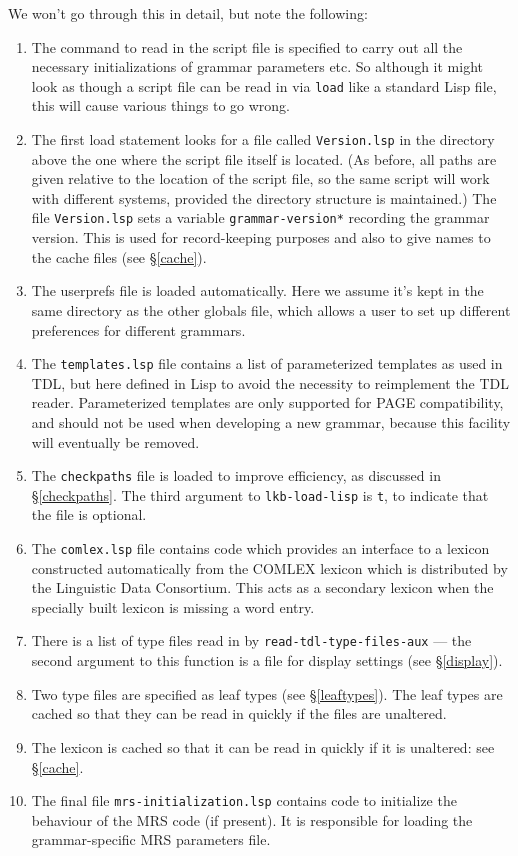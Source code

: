 \documentclass[12pt]{report}
\newcommand{\filename}[1]{{\tt #1}}
\newcommand{\functionname}[1]{{\tt #1}}
\newcommand{\lkbparam}[1]{{\tt #1}}
\begin{document}
We won't go through this in detail, but
note the following:
\begin{enumerate}
\item The command to read in the script file is specified
to carry out all the necessary initializations of grammar parameters
etc.  So although it might look as though a script file can
be read in via \functionname{load} like a standard Lisp file, this will
cause various things to go wrong.
\item The first load statement looks for a file called \filename{Version.lsp}
in the directory above the one where the script file itself is located.
(As before, all paths are given relative to the location of the
script file, so the same script will work with different
systems, provided the directory structure is maintained.)
The file \filename{Version.lsp}
sets a variable \lkbparam{*grammar-version*} 
recording the grammar version.  This is used for 
record-keeping purposes and also to give names to the 
cache files (see \S\ref{cache}).
\item The userprefs file is loaded automatically.  Here we assume it's
kept in the same directory as the other globals file, which allows
a user to set up different preferences for different grammars.
\item The \filename{templates.lsp} file contains a list of 
parameterized templates as used in TDL, but here defined in Lisp
to avoid the necessity to reimplement the TDL reader.
Parameterized templates are only supported for PAGE compatibility,
and should not be used when developing a new grammar, because this
facility will eventually be removed.
\item The \filename{checkpaths} file is loaded to improve efficiency,
as discussed in \S\ref{checkpaths}.  The third argument to 
\functionname{lkb-load-lisp} is {\tt t}, to indicate that the file is optional.
\item The \filename{comlex.lsp} file contains code which provides an
interface to a lexicon constructed automatically from the COMLEX lexicon
which is distributed by the Linguistic Data Consortium. 
This acts as a secondary lexicon when the specially built lexicon
is missing a word entry.
\item There is a list of type files read in by 
\functionname{read-tdl-type-files-aux}
--- the second argument to this function is a file for
display settings (see \S\ref{display}).
\item Two type files are specified as leaf types (see \S\ref{leaftypes}).
The leaf types are cached so that they can be read in quickly if the
files are unaltered.
\item The lexicon is cached so that it can be read in quickly if it is
unaltered: see \S\ref{cache}.
\item The final file \filename{mrs-initialization.lsp}
contains code to initialize the
behaviour of the MRS code (if present).  It is responsible for loading the
grammar-specific MRS parameters file.
\end{enumerate}
\end{document}
